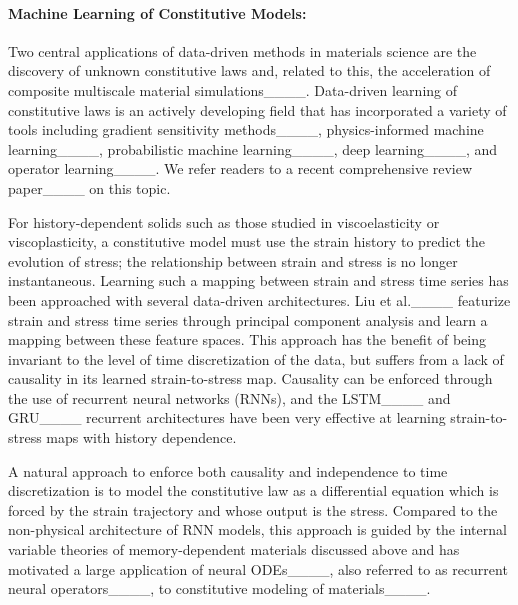 \paragraph{Machine Learning of Constitutive Models:}
Two central applications of data-driven methods in materials science are the discovery of unknown constitutive laws and, related to this, the acceleration of composite multiscale material simulations____. Data-driven learning of constitutive laws is an actively developing field that has incorporated a variety of tools including gradient sensitivity methods____, physics-informed machine learning____, probabilistic machine learning____, deep learning____, and operator learning____. We refer readers to a recent comprehensive review paper____ on this topic.

For history-dependent solids such as those studied in viscoelasticity or viscoplasticity, a constitutive model must use the strain history to predict the evolution of stress; the relationship between strain and stress is no longer instantaneous. Learning such a mapping between strain and stress time series has been approached with several data-driven architectures. Liu et al.____ featurize strain and stress time series through principal component analysis and learn a mapping between these feature spaces. This approach has the benefit of being invariant to the level of time discretization of the data, but suffers from a lack of causality in its learned strain-to-stress map. Causality can be enforced through the use of recurrent neural networks (RNNs), and the LSTM____ and  GRU____ recurrent architectures have been very effective at learning strain-to-stress maps with history dependence.

A natural approach to enforce both causality and independence to time discretization is to model the constitutive law as a differential equation which is forced by the strain trajectory and whose output is the stress. Compared to the non-physical architecture of RNN models, this approach is guided by the internal variable theories of memory-dependent materials discussed above and has motivated a large application of neural ODEs____, also referred to as recurrent neural operators____, to constitutive modeling of materials____.~\\

